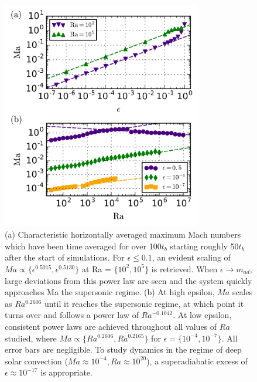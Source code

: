 \documentclass[aps, prl, twocolumn, groupedaddress, amsfonts, amssymb, amsmath]{revtex4-1}
\begin{document}
\begin{figure}[t]
\includegraphics[width=3.4375in]{./figs/ma_v_eps.png}
\caption{(a) Characteristic horizontally averaged maximum Mach numbers which have been
time averaged for over 100$t_{b}$ starting roughly 50$t_{b}$ after the start of simulations. For $\epsilon \leq 0.1$,
an evident scaling of $Ma \propto \{\epsilon^{0.5015}, \epsilon^{0.5130}\}$ 
at Ra = $\{10^2, 10^5\}$ is retrieved.
When $\epsilon \rightarrow m_{ad}$, large deviations from this power law are seen and the system quickly
approaches Ma the supersonic regime.  
(b) At high epsilon, $Ma$ scales as $Ra^{0.2606}$ until it reaches the supersonic regime, at which point it turns
over and follows a power law of $Ra^{-0.1042}$.  At low epsilon, consistent power laws are achieved throughout all
values of $Ra$ studied, where $Ma \propto \{Ra^{0.2606}, Ra^{0.2165}\}$ for $\epsilon = \{10^{-4}, 10^{-7}\}$. All
error bars are negligible.  To study dynamics in the regime of deep solar convection ($Ma \approx 10^{-4}, 
Ra \approx 10^{20}$), a superadiabatic excess of $\epsilon \approx 10^{-17}$ is appropriate.
\label{fig:ma_v_eps} }
\end{figure}
\end{document}
